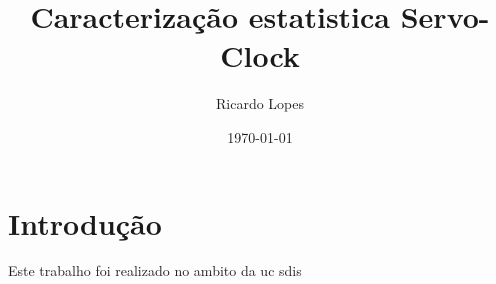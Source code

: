 \documentclass[ident=true,pt,pdftex,11pt,a4paper]{skrapport}
\begin{document}
    \begin{titlepage}
        \author[ee08001@fe.up.pt]{Ricardo Lopes}
        \date{\today}
        \title{Caracterização estatistica Servo-Clock}
        \maketitle
    \end{titlepage}

    \section{Introdução}
        Este trabalho foi realizado no ambito da uc sdis
\end{document}
